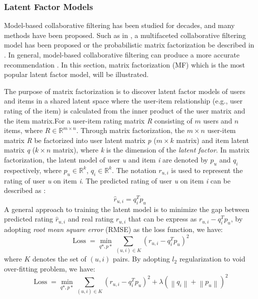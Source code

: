\subsubsection{Latent Factor Models}
Model-based collaborative filtering has been studied for decades, and many methods have been proposed. Such as in \cite{multifacetedcf}, a multifaceted collaborative filtering model has been proposed or the probabilistic matrix factorization be described in \cite{Probabilistic}. In general, model-based collaborative filtering can produce a more accurate recommendation \cite{multifacetedcf}. In this section, matrix factorization (MF) which is the most popular latent factor model, will be illustrated.

The purpose of matrix factorization is to discover latent factor models of users and items in a shared latent space where the user-item relationship (e.g., user rating of the item) is calculated from the inner product of the user matrix and the item matrix.For a user-item rating matrix \textit{R} consisting of $m$ users and $n$ items, where $R\in\mathbb{R}^{m\times n}$. Through matrix factorization, the $m\times n$ user-item matrix \textit{R} be factorized into user latent matrix \textit{p} ($m\times k$ matrix) and item latent matrix \textit{q} ($k\times n$ matrix), where \textit{k} is the dimension of the \textit{latent factor}. In matrix factorization, the latent model of user \textit{u} and item \textit{i} are denoted by $p_{u}$ and $q_{i}$ respectively, where $p_{u} \in\mathbb{R}^{k}$, $q_{i} \in\mathbb{R}^{k}$. The notation ${r}_{u,i}$ is used to represent the rating of user \textit{u} on item \textit{i}. The predicted rating of user \textit{u} on item \textit{i} can be described as :
\begin{equation}
    \hat{r}_{u,i}=q_{i}^{T}p_{u}
\end{equation}
A general approach to training the latent model is to minimize the gap between predicted rating $\hat{r}_{u,i}$ and real rating $r_{u,i}$ that can be express as ${r}_{u,i}-q_{i}^{T}p_{u}$, by adopting \textit{root mean square error} (RMSE) as the loss function, we have:
    \begin{equation}
        \operatorname{Loss}=\min_{ q *, p * }\sum_{(u, i) \in K}\left(r_{u,i}-q_{i}^{T} p_{u}\right)^{2}
    \end{equation}
where $K$ denotes the set of $(u,i)$ pairs. By adopting $\mathit{l}_{2}$ regularization to void over-fitting problem, we have:
    \begin{equation}
        \operatorname{Loss}=\min_{ q *, p * }\sum_{(u, i) \in K}\left(r_{u, i}-q_{i}^{T} p_{u}\right)^{2}+\lambda\left(\left\|q_{i}\right\|+\left\|p_{u}\right\|\right)^{2}
    \end{equation}